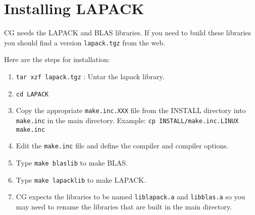 \documentclass{article}
\begin{document}
% 


\clearpage
\section{Installing LAPACK}

CG needs the LAPACK and BLAS libraries. If you need to build these libraries you
should find a version {\tt lapack.tgz} from the web. 

\noindent Here are the steps for installation:
\begin{enumerate}
    \item {\tt tar xzf lapack.tgz} :  Untar the lapack library.
    \item {\tt cd LAPACK}
    \item Copy the appropriate {\tt make.inc.XXX} file from the INSTALL directory into
           {\tt make.inc} in the main directory. Example: {\tt cp INSTALL/make.inc.LINUX make.inc}
    \item Edit the {\tt make.inc} file and define the compiler and compiler options.
    \item Type {\tt make blaslib} to make BLAS.
    \item Type {\tt make lapacklib} to make LAPACK.
    \item CG expects the libraries to be named {\tt liblapack.a} and {\tt libblas.a}
          so you may need to rename the libraries that are built in the main directory.
\end{enumerate}
\end{document}
